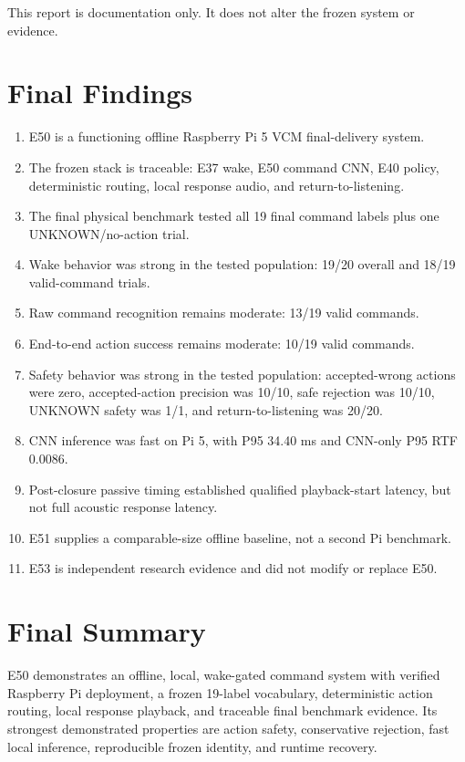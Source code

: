 \documentclass[11pt]{article}
\begin{document}
This report is documentation only. It does not alter the frozen system or evidence.

\section{Final Findings}

\begin{enumerate}
\item E50 is a functioning offline Raspberry Pi 5 VCM final-delivery system.
\item The frozen stack is traceable: E37 wake, E50 command CNN, E40 policy, deterministic routing, local response audio, and return-to-listening.
\item The final physical benchmark tested all 19 final command labels plus one UNKNOWN/no-action trial.
\item Wake behavior was strong in the tested population: 19/20 overall and 18/19 valid-command trials.
\item Raw command recognition remains moderate: 13/19 valid commands.
\item End-to-end action success remains moderate: 10/19 valid commands.
\item Safety behavior was strong in the tested population: accepted-wrong actions were zero, accepted-action precision was 10/10, safe rejection was 10/10, UNKNOWN safety was 1/1, and return-to-listening was 20/20.
\item CNN inference was fast on Pi 5, with P95 34.40 ms and CNN-only P95 RTF 0.0086.
\item Post-closure passive timing established qualified playback-start latency, but not full acoustic response latency.
\item E51 supplies a comparable-size offline baseline, not a second Pi benchmark.
\item E53 is independent research evidence and did not modify or replace E50.
\end{enumerate}

\section{Final Summary}

E50 demonstrates an offline, local, wake-gated command system with verified Raspberry Pi deployment, a frozen 19-label vocabulary, deterministic action routing, local response playback, and traceable final benchmark evidence. Its strongest demonstrated properties are action safety, conservative rejection, fast local inference, reproducible frozen identity, and runtime recovery.
\end{document}

